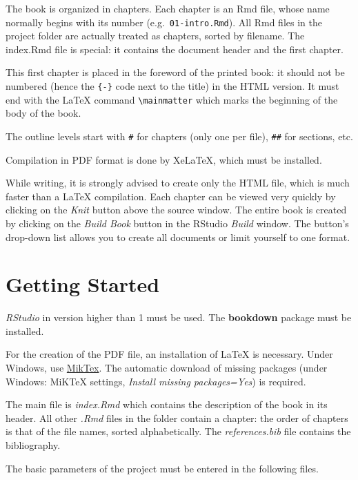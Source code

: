 \documentclass[
  12pt,
  american,
  a4paper,
  extrafontsizes,onecolumn,openright
  ]{memoir}
\begin{document}
\normalsize

The book is organized in chapters.
Each chapter is an Rmd file, whose name normally begins with its number (e.g.~\texttt{01-intro.Rmd}).
All Rmd files in the project folder are actually treated as chapters, sorted by filename.
The index.Rmd file is special: it contains the document header and the first chapter.

This first chapter is placed in the foreword of the printed book: it should not be numbered (hence the \texttt{\{-\}} code next to the title) in the HTML version.
It must end with the LaTeX command \texttt{\textbackslash{}mainmatter} which marks the beginning of the body of the book.

The outline levels start with \texttt{\#} for chapters (only one per file), \texttt{\#\#} for sections, etc.

Compilation in PDF format is done by XeLaTeX, which must be installed.

While writing, it is strongly advised to create only the HTML file, which is much faster than a LaTeX compilation.
Each chapter can be viewed very quickly by clicking on the \emph{Knit} button above the source window.
The entire book is created by clicking on the \emph{Build Book} button in the RStudio \emph{Build} window.
The button's drop-down list allows you to create all documents or limit yourself to one format.

\mainmatter

\chapter{Getting Started}\label{getting_started}

\emph{RStudio} in version higher than 1 must be used.
The \textbf{bookdown} package must be installed.

For the creation of the PDF file, an installation of LaTeX is necessary.
Under Windows, use \href{https://miktex.org/download}{MikTex}.
The automatic download of missing packages (under Windows: MiKTeX settings, \emph{Install missing packages=Yes}) is required.

The main file is \emph{index.Rmd} which contains the description of the book in its header.
All other \emph{.Rmd} files in the folder contain a chapter: the order of chapters is that of the file names, sorted alphabetically.
The \emph{references.bib} file contains the bibliography.

The basic parameters of the project must be entered in the following files.
\end{document}
